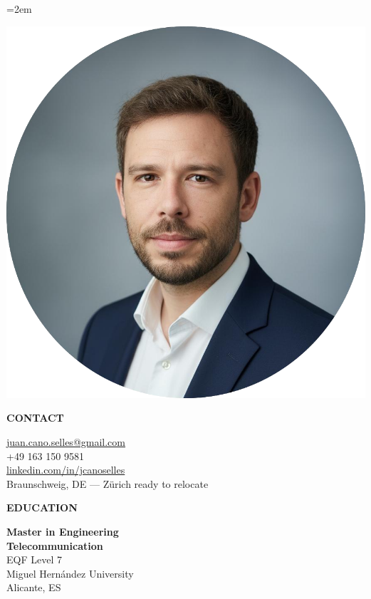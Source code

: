 \documentclass[12pt,a4paper]{article}
\newcommand{\headleft}[1]{%
  \vspace*{2ex}\textsc{\textbf{\color{softwhite}#1}}\par%
  \vspace*{-1.2ex}{\color{softwhite}\hrulefill}\par\vspace*{0.8ex}
}
\newlength{\SideBarW}
\begin{document}
\pagestyle{empty}
\sloppy
\emergencystretch=2em
\setlength{\parindent}{0pt}
\setlength{\parskip}{0pt}

\vspace*{-10mm}
\noindent\begin{minipage}[t]{\textwidth}

\colorbox{cvblue!90}{%
  \parbox[t][\textheight][t]{\SideBarW}{%
    \hspace*{4mm}%
    \begin{minipage}[t]{\dimexpr\linewidth-8mm\relax}
      \color{softwhite}
      \vspace*{6mm}
      \begin{center}
        \includegraphics[width=0.85\linewidth]{Resume_Juan_Cano.png}
      \end{center}

      \headleft{CONTACT}
      \small
      \href{mailto:juan.cano.selles@gmail.com}{juan.cano.selles@gmail.com}\\[0.6ex]
      +49 163 150 9581\\[0.6ex]
      \href{https://www.linkedin.com/in/jcanoselles}{linkedin.com/in/jcanoselles}\\[0.6ex]
      Braunschweig, DE — Zürich ready to relocate
      \normalsize

      \vspace*{3mm}

      \headleft{EDUCATION}
      \textbf{Master in Engineering}\\[0.2ex]
      \textbf{Telecommunication}\\[0.6ex]
      {\small EQF Level 7}\\[0.4ex]
      {\small Miguel Hernández University}\\[0.4ex]
      {\small Alicante, ES}


\end{minipage}}}
\end{minipage}
\end{document}
